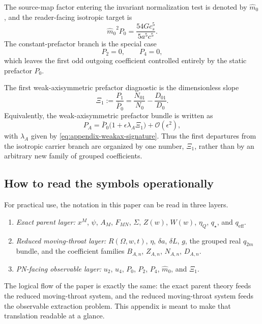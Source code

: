 \documentclass[11pt]{article}
\theoremstyle{definition}
\newcommand{\eff}{\mathrm{eff}}
\newcommand{\mhat}{\ensuremath{\hat m_0}}
\newcommand{\XiOne}{\ensuremath{\Xi_1}}
\newcommand{\cO}{\mathcal O}
\begin{document}
The source-map factor entering the invariant normalization test is denoted by $\mhat$, and the reader-facing isotropic target is
\begin{equation}
\mhat^{2}P_0=\frac{54Gc_s^5}{5a^5c^5}.
\label{eq:appendix-normalization-target}
\end{equation}
The constant-prefactor branch is the special case
\begin{equation}
P_2=0,
\qquad
P_4=0,
\label{eq:appendix-constant-prefactor}
\end{equation}
which leaves the first odd outgoing coefficient controlled entirely by the static prefactor $P_0$.

The first weak-axisymmetric prefactor diagnostic is the dimensionless slope
\begin{equation}
\XiOne:=\frac{P_1}{\bar P_0}
=\frac{N_{01}}{N_0}-\frac{D_{01}}{D_0}.
\label{eq:appendix-Xi1-def}
\end{equation}
Equivalently, the weak-axisymmetric prefactor bundle is written as
\begin{equation}
P_A=\bar P_0\bigl(1+\epsilon\lambda_A\XiOne\bigr)+\cO(\epsilon^2),
\label{eq:appendix-PA-weakax}
\end{equation}
with $\lambda_A$ given by \eqref{eq:appendix-weakax-signature}. Thus the first departures from the isotropic carrier branch are organized by one number, $\XiOne$, rather than by an arbitrary new family of grouped coefficients.

\subsection{How to read the symbols operationally}

For practical use, the notation in this paper can be read in three layers.
\begin{enumerate}
    \item \emph{Exact parent layer:} $x^M$, $\psi$, $A_M$, $F_{MN}$, $\Sigma$, $Z(w)$, $W(w)$, $\eta_Q$, $q_\star$, and $q_{\eff}$.
    \item \emph{Reduced moving-throat layer:} $R(\Omega,w,t)$, $\eta$, $\delta a$, $\delta L$, $g$, the grouped real $q_{2m}$ bundle, and the coefficient families $B_{A,n}$, $Z_{A,n}$, $N_{A,n}$, $D_{A,n}$.
    \item \emph{PN-facing observable layer:} $u_2$, $u_4$, $P_0$, $P_2$, $P_4$, $\mhat$, and $\XiOne$.
\end{enumerate}
The logical flow of the paper is exactly the same: the exact parent theory feeds the reduced moving-throat system, and the reduced moving-throat system feeds the observable extraction problem. This appendix is meant to make that translation readable at a glance.
\end{document}
